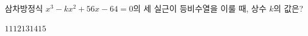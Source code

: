 삼차방정식 $x^3-kx^2+56x-64=0$의 세 실근이 등비수열을 이룰 때, 상수 $k$의 값은?
\begin{choices32}{$11$}{$12$}{$13$}{$14$}{$15$}\end{choices32}
